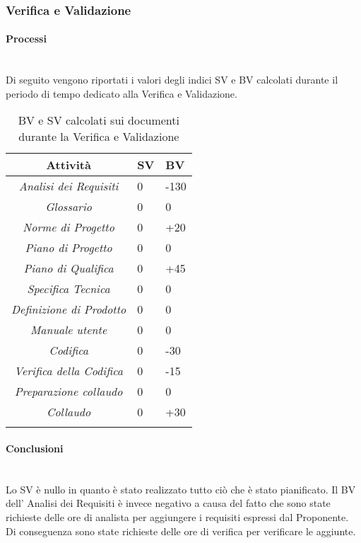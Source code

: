 \subsubsection{Verifica e Validazione}
\paragraph{Processi} \hfill\\
Di seguito vengono riportati i valori degli indici SV e BV calcolati durante il periodo di tempo dedicato alla Verifica e Validazione.
\begin{longtable}{|c|p{3cm}|p{3cm}|}
\toprule
\textbf{Attività} & \textbf{SV} & \textbf{BV} \\


\midrule
\emph{Analisi dei Requisiti} & 0 & -130 \\
\midrule
\emph{Glossario} & 0 & 0 \\
\midrule
\emph{Norme di Progetto} & 0 & +20 \\
\midrule
\emph{Piano di Progetto} & 0 & 0 \\
\midrule
\emph{Piano di Qualifica} & 0 & +45 \\
\midrule
\emph{Specifica Tecnica} & 0 & 0 \\
\midrule
\emph{Definizione di Prodotto} & 0 & 0 \\
\midrule
\emph{Manuale utente} & 0 & 0 \\
\midrule
\emph{Codifica} & 0 & -30 \\
\midrule
\emph{Verifica della Codifica} & 0 & -15 \\
\midrule
\emph{Preparazione collaudo} & 0 & 0 \\
\midrule
\emph{Collaudo} & 0 & +30 \\
\bottomrule
\caption{BV e SV calcolati sui documenti durante la Verifica e Validazione}
\label{tab:changelog}
\end{longtable}

\paragraph{Conclusioni} \hfill\\
Lo SV è nullo in quanto è stato realizzato tutto ciò che è stato pianificato.
Il BV dell' Analisi dei Requisiti è invece negativo a causa del fatto che sono state richieste delle ore di analista per aggiungere i requisiti espressi dal Proponente. Di conseguenza sono state richieste delle ore di verifica per verificare le aggiunte.



